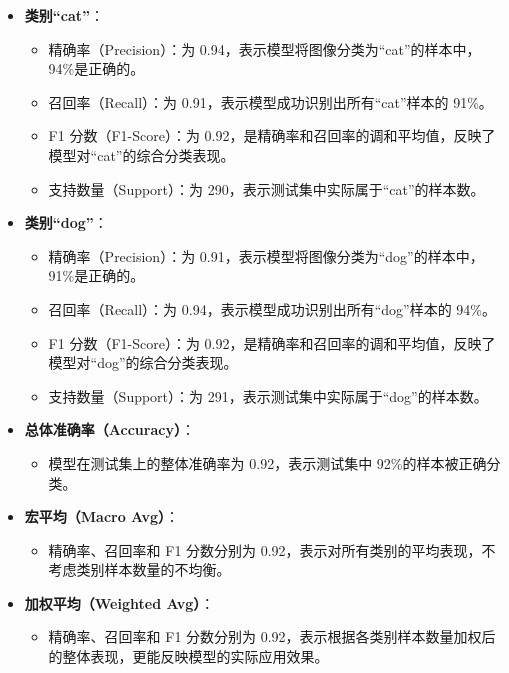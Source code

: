 \begin{itemize}
    \item \textbf{类别“cat”}：
    \begin{itemize}
        \item 精确率（Precision）：为 0.94，表示模型将图像分类为“cat”的样本中，94\%是正确的。
        \item 召回率（Recall）：为 0.91，表示模型成功识别出所有“cat”样本的 91\%。
        \item F1 分数（F1-Score）：为 0.92，是精确率和召回率的调和平均值，反映了模型对“cat”的综合分类表现。
        \item 支持数量（Support）：为 290，表示测试集中实际属于“cat”的样本数。
    \end{itemize}
    
    \item \textbf{类别“dog”}：
    \begin{itemize}
        \item 精确率（Precision）：为 0.91，表示模型将图像分类为“dog”的样本中，91\%是正确的。
        \item 召回率（Recall）：为 0.94，表示模型成功识别出所有“dog”样本的 94\%。
        \item F1 分数（F1-Score）：为 0.92，是精确率和召回率的调和平均值，反映了模型对“dog”的综合分类表现。
        \item 支持数量（Support）：为 291，表示测试集中实际属于“dog”的样本数。
    \end{itemize}

    \item \textbf{总体准确率（Accuracy）}：
    \begin{itemize}
        \item 模型在测试集上的整体准确率为 0.92，表示测试集中 92\%的样本被正确分类。
    \end{itemize}

    \item \textbf{宏平均（Macro Avg）}：
    \begin{itemize}
        \item 精确率、召回率和 F1 分数分别为 0.92，表示对所有类别的平均表现，不考虑类别样本数量的不均衡。
    \end{itemize}

    \item \textbf{加权平均（Weighted Avg）}：
    \begin{itemize}
        \item 精确率、召回率和 F1 分数分别为 0.92，表示根据各类别样本数量加权后的整体表现，更能反映模型的实际应用效果。
    \end{itemize}
\end{itemize}

